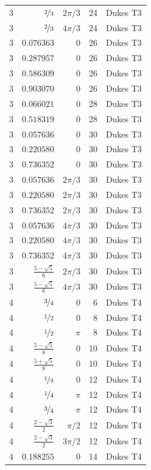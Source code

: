 \begin{longtable}{rrrrc}
3 & $\nicefrac{2}{3}$ & $2\pi/3$ & 24 & Dukes T3 \\
3 & $\nicefrac{2}{3}$ & $4\pi/3$ & 24 & Dukes T3 \\
3 & $0.076363$ & $0$ & 26 & Dukes T3 \\
3 & $0.287957$ & $0$ & 26 & Dukes T3 \\
3 & $0.586309$ & $0$ & 26 & Dukes T3 \\
3 & $0.903070$ & $0$ & 26 & Dukes T3 \\
3 & $0.066021$ & $0$ & 28 & Dukes T3 \\
3 & $0.518319$ & $0$ & 28 & Dukes T3 \\
3 & $0.057636$ & $0$ & 30 & Dukes T3 \\
3 & $0.220580$ & $0$ & 30 & Dukes T3 \\
3 & $0.736352$ & $0$ & 30 & Dukes T3 \\
3 & $0.057636$ & $2\pi/3$ & 30 & Dukes T3 \\
3 & $0.220580$ & $2\pi/3$ & 30 & Dukes T3 \\
3 & $0.736352$ & $2\pi/3$ & 30 & Dukes T3 \\
3 & $0.057636$ & $4\pi/3$ & 30 & Dukes T3 \\
3 & $0.220580$ & $4\pi/3$ & 30 & Dukes T3 \\
3 & $0.736352$ & $4\pi/3$ & 30 & Dukes T3 \\
3 & $\frac{5 - \sqrt{5}}{6}$ & $2\pi/3$ & 30 & Dukes T3 \\
3 & $\frac{5 - \sqrt{5}}{6}$ & $4\pi/3$ & 30 & Dukes T3 \\
4 & $\nicefrac{3}{4}$ & $0$ & 6 & Dukes T4 \\
4 & $\nicefrac{1}{2}$ & $0$ & 8 & Dukes T4 \\
4 & $\nicefrac{1}{2}$ & $\pi$ & 8 & Dukes T4 \\
4 & $\frac{5 - \sqrt{5}}{8}$ & $0$ & 10 & Dukes T4 \\
4 & $\frac{5 + \sqrt{5}}{8}$ & $0$ & 10 & Dukes T4 \\
4 & $\nicefrac{1}{4}$ & $0$ & 12 & Dukes T4 \\
4 & $\nicefrac{1}{4}$ & $\pi$ & 12 & Dukes T4 \\
4 & $\nicefrac{3}{4}$ & $\pi$ & 12 & Dukes T4 \\
4 & $\frac{2 - \sqrt{3}}{2}$ & $\pi/2$ & 12 & Dukes T4 \\
4 & $\frac{2 - \sqrt{3}}{2}$ & $3\pi/2$ & 12 & Dukes T4 \\
4 & $0.188255$ & $0$ & 14 & Dukes T4 \\

\end{longtable}
